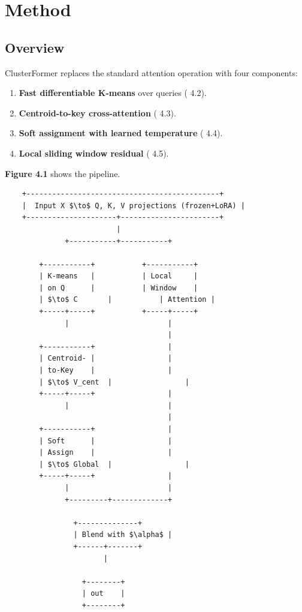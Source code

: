 \section{Method}

\subsection{Overview}

ClusterFormer replaces the standard attention operation with four 
components:

\begin{enumerate}
\item \textbf{Fast differentiable K-means} over queries ( 4.2).
\item \textbf{Centroid-to-key cross-attention} ( 4.3).
\item \textbf{Soft assignment with learned temperature} ( 4.4).
\item \textbf{Local sliding window residual} ( 4.5).

\end{enumerate}
\textbf{Figure 4.1} shows the pipeline.

\begin{lstlisting}
    +---------------------------------------------+
    |  Input X $\to$ Q, K, V projections (frozen+LoRA) |
    +---------------------+-----------------------+
                          |
              +-----------+-----------+
                                       
        +-----------+           +-----------+
        | K-means   |           | Local     |
        | on Q      |           | Window    |
        | $\to$ C       |           | Attention |
        +-----+-----+           +-----+-----+
              |                       |
                                      |
        +-----------+                 |
        | Centroid- |                 |
        | to-Key    |                 |
        | $\to$ V_cent  |                 |
        +-----+-----+                 |
              |                       |
                                      |
        +-----------+                 |
        | Soft      |                 |
        | Assign    |                 |
        | $\to$ Global  |                 |
        +-----+-----+                 |
              |                       |
              +---------+-------------+
                         
                +--------------+
                | Blend with $\alpha$ |
                +------+-------+
                       |
                        
                  +--------+
                  | out    |
                  +--------+
\end{lstlisting}

